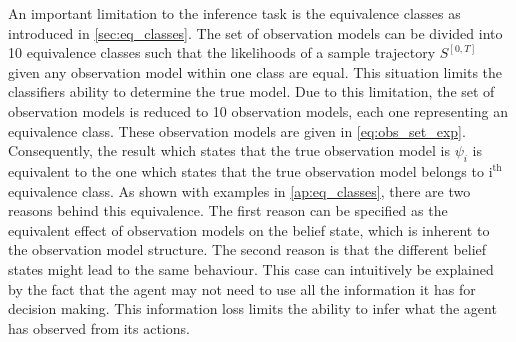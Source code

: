 An important limitation to the inference task is the equivalence classes as introduced in \cref{sec:eq_classes}. The set of observation models can be divided into 10 equivalence classes such that the likelihoods of a sample trajectory $ S^{[0, T]} $ given any observation model within one class are equal. This situation limits the classifiers ability to determine the true model. Due to this limitation, the set of observation models is reduced to 10 observation models, each one representing an equivalence class. These observation models are given in \cref{eq:obs_set_exp}. Consequently, the result which states that the true observation model is $ \psi_i $ is equivalent to the one which states that the true observation model belongs to $ \text{i}^{\text{th}} $ equivalence class. As shown with examples in \cref{ap:eq_classes}, there are two reasons behind this equivalence. The first reason can be specified as the equivalent effect of observation models on the belief state, which is inherent to the observation model structure. The second reason is that the different belief states might lead to the same behaviour. This case can intuitively be explained by the fact that the agent may not need to use all the information it has for decision making. This information loss limits the ability to infer what the agent has observed from its actions.

